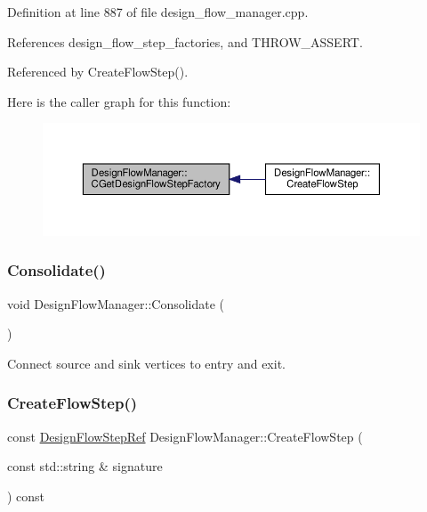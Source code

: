 Definition at line 887 of file design\+\_\+flow\+\_\+manager.\+cpp.



References design\+\_\+flow\+\_\+step\+\_\+factories, and T\+H\+R\+O\+W\+\_\+\+A\+S\+S\+E\+RT.



Referenced by Create\+Flow\+Step().

Here is the caller graph for this function\+:
\nopagebreak
\begin{figure}[H]
\begin{center}
\leavevmode
\includegraphics[width=350pt]{de/d63/classDesignFlowManager_af6188161209a658023cd0c26dae9d4ca_icgraph}
\end{center}
\end{figure}
\mbox{\label{classDesignFlowManager_a7c196a82bdb37a21941565f453fa3814}} 
\subsubsection{\texorpdfstring{Consolidate()}{Consolidate()}}
{\footnotesize\ttfamily void Design\+Flow\+Manager\+::\+Consolidate (\begin{DoxyParamCaption}{ }\end{DoxyParamCaption})\hspace{0.3cm}{\ttfamily [private]}}



Connect source and sink vertices to entry and exit. 

\mbox{\label{classDesignFlowManager_a163f98e734cb159907e23c3f6f9abda9}} 
\subsubsection{\texorpdfstring{Create\+Flow\+Step()}{CreateFlowStep()}}
{\footnotesize\ttfamily const \hyperlink{design__flow__step_8hpp_a9dd6b4474ddf52d41a78b1aaa12ae6c8}{Design\+Flow\+Step\+Ref} Design\+Flow\+Manager\+::\+Create\+Flow\+Step (\begin{DoxyParamCaption}\item[{const std\+::string \&}]{signature }\end{DoxyParamCaption}) const}



